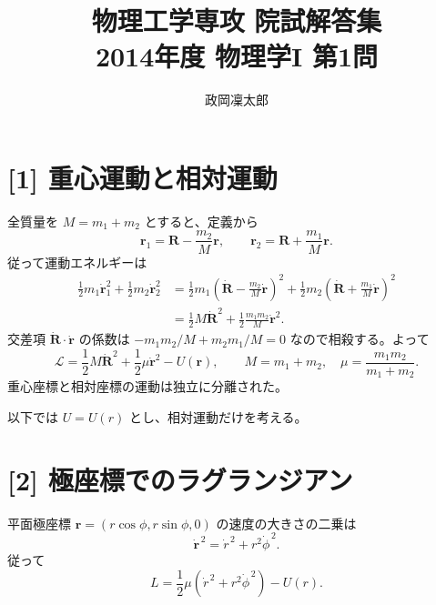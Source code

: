 \documentclass[11pt,a4paper]{article}
\title{物理工学専攻 院試解答集\\2014年度 物理学I 第1問}
\author{政岡凜太郎}
\date{}
\begin{document}
\maketitle

\section*{[1] 重心運動と相対運動}
全質量を $M=m_1+m_2$ とすると、定義から
\begin{equation}
 \boldsymbol r_1=\boldsymbol R-\frac{m_2}{M}\boldsymbol r,
 \qquad \boldsymbol r_2=\boldsymbol R+\frac{m_1}{M}\boldsymbol r.
\end{equation}
従って運動エネルギーは
\begin{align}
 \frac12m_1\dot{\boldsymbol r}_1^2+\frac12m_2\dot{\boldsymbol r}_2^2
 &=\frac12m_1\left(\dot{\boldsymbol R}-\frac{m_2}{M}\dot{\boldsymbol r}\right)^2
  +\frac12m_2\left(\dot{\boldsymbol R}+\frac{m_1}{M}\dot{\boldsymbol r}\right)^2\\
 &=\frac12M\dot{\boldsymbol R}^2+
   \frac12\frac{m_1m_2}{M}\dot{\boldsymbol r}^2.
\end{align}
交差項 $\dot{\boldsymbol R}\cdot\dot{\boldsymbol r}$ の係数は $-m_1m_2/M+m_2m_1/M=0$ なので相殺する。よって
\begin{equation}
 \boxed{\mathcal L=\frac12M\dot{\boldsymbol R}^2+
 \frac12\mu\dot{\boldsymbol r}^2-U(\boldsymbol r),\qquad
 M=m_1+m_2,\quad \mu=\frac{m_1m_2}{m_1+m_2}.}
\end{equation}
重心座標と相対座標の運動は独立に分離された。

以下では $U=U(r)$ とし、相対運動だけを考える。

\section*{[2] 極座標でのラグランジアン}
平面極座標 $\boldsymbol r=(r\cos\phi,r\sin\phi,0)$ の速度の大きさの二乗は
\begin{equation}
 \dot{\boldsymbol r}^{\,2}=\dot r^{\,2}+r^2\dot\phi^{\,2}.
\end{equation}
従って
\begin{equation}
 \boxed{L=\frac12\mu(\dot r^{\,2}+r^2\dot\phi^{\,2})-U(r).}
\end{equation}
\end{document}

